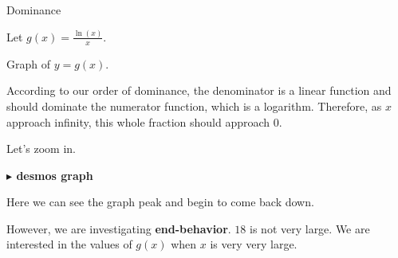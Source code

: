 \documentclass{ximera}
\begin{document}
\begin{example} Dominance


Let $g(x) = \frac{\ln(x)}{x}$.

Graph of $y = g(x)$.


According to our order of dominance, the denominator is a linear function and should dominate the numerator function, which is a logarithm.  Therefore, as $x$ approach infinity, this whole fraction should approach $0$.


\begin{image}
\end{image}










Let's zoom in.




\begin{onlineOnly}
\textbf{\textcolor{blue!55!black}{$\blacktriangleright$ desmos graph}} 
\begin{center}
\end{center}
\end{onlineOnly}





Here we can see the graph peak and begin to come back down.   


However, we are investigating \textbf{end-behavior}.  $18$ is not very large. We are interested in the values of $g(x)$ when $x$ is very very large.  


\end{example}
\end{document}
